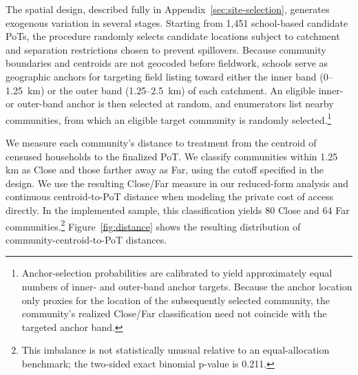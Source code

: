 \documentclass[ECM\space ReStud.tex]{subfiles}
\begin{document}
The spatial design, described fully in Appendix~\ref{sec:site-selection}, generates exogenous variation in several stages. Starting from 1,451 school-based candidate PoTs, the procedure randomly selects candidate locations subject to  catchment and separation restrictions chosen to prevent spillovers. Because community boundaries and centroids are not geocoded before fieldwork, schools serve as geographic anchors for targeting field listing toward either the inner band (0--1.25~km) or the outer band (1.25--2.5~km) of each catchment. An eligible inner- or outer-band anchor is then selected at random, and enumerators list nearby communities, from which an eligible target community is randomly selected.\footnote{Anchor-selection probabilities are calibrated to yield approximately equal numbers of inner- and outer-band anchor targets. Because the anchor location only proxies for the location of the subsequently selected community, the community's realized Close/Far classification need not coincide with the targeted anchor band.}

We measure each community’s distance to treatment from the centroid of censused households to the finalized PoT. We classify communities within 1.25 km as Close and those farther away as Far, using the cutoff specified in the design. We use the resulting Close/Far measure in our reduced-form analysis and continuous centroid-to-PoT distance when modeling the private cost of access directly. In the implemented sample, this classification yields 80 Close and 64 Far communities.\footnote{This imbalance is not statistically unusual relative to an equal-allocation benchmark; the two-sided exact binomial p-value is 0.211.} Figure~\ref{fig:distance} shows the resulting distribution of community-centroid-to-PoT distances.


\end{document}
